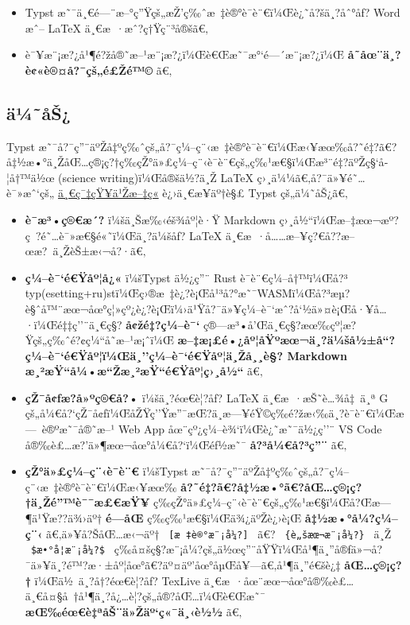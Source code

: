 \begin{itemize}
\tightlist
\item
  Typst æ˜¯ä¸€é---¨æ--°ç''Ÿçš„æŽ'ç‰ˆæ~‡è®°è¯­è¨€ï¼Œè¿˜å?šä¸?åˆ°åƒ? Word
  æˆ-- LaTeX ä¸€æ~·æˆ?ç†Ÿç¨³å®šã€‚
\item
  è¯¥æ¨¡æ?¿å¹¶é?žå®˜æ--¹æ¨¡æ?¿ï¼Œè€Œæ˜¯æ°`é---´æ¨¡æ?¿ï¼Œ
  \textbf{å­˜åœ¨ä¸?è¢«è®¤å?¯çš„é£Žé™©} ã€‚
\end{itemize}

\subsection{ä¼˜åŠ¿}\label{uxe4uxbcuxe5ux161}

Typst
æ˜¯å?¯ç''¨äºŽå‡ºç‰ˆçš„å?¯ç¼--ç¨‹æ~‡è®°è¯­è¨€ï¼Œæ‹¥æœ‰å?˜é‡?ã€?å‡½æ•°ä¸ŽåŒ\ldots ç®¡ç?†ç­‰çŽ°ä»£ç¼--ç¨‹è¯­è¨€çš„ç‰¹æ€§ï¼Œæ³¨é‡?äºŽç§`å­¦å†™ä½œ
(science writing)ï¼Œå®šä½?ä¸Ž LaTeX ç›¸ä¼¼ã€‚å?¯ä»¥é˜\ldots è¯»æˆ`çš„
\href{https://zhuanlan.zhihu.com/p/669097092}{ä¸€ç¯‡çŸ¥ä¹Žæ--‡ç«}
è¿›ä¸€æ­¥äº†è§£ Typst çš„ä¼˜åŠ¿ã€‚

\begin{itemize}
\tightlist
\item
  \textbf{è¯­æ³•ç®€æ´?} ï¼šä¸Šæ‰‹éš¾åº¦è·Ÿ Markdown
  ç›¸å½``ï¼Œæ--‡æœ¬æº?ç~?é˜\ldots è¯»æ€§é«˜ï¼Œä¸?ä¼šåƒ? LaTeX
  ä¸€æ~·å\ldots\ldots æ--¥ç?€å??æ--œæ?~ä¸ŽèŠ±æ‹¬å?·ã€‚
\item
  \textbf{ç¼--è¯`é€Ÿåº¦å¿«} ï¼šTypst ä½¿ç''¨ Rust è¯­è¨€ç¼--å†™ï¼Œå?³
  typ(esetting+ru)stï¼Œç›®æ~‡è¿?è¡Œå¹³å?°æ˜¯WASMï¼Œå?³æµ?è§ˆå™¨æœ¬åœ°ç¦»çº¿è¿?è¡Œï¼›ä¹Ÿå?¯ä»¥ç¼--è¯`æˆ?å`½ä»¤è¡Œå·¥å\ldots·ï¼Œé‡‡ç''¨ä¸€ç§?
  \textbf{å¢žé‡?ç¼--è¯`}
  ç®---æ³•å'Œä¸€ç§?æœ‰çº¦æ?Ÿçš„ç‰ˆé?¢ç¼``å­˜æ--¹æ¡ˆï¼Œ
  \textbf{æ--‡æ¡£é•¿åº¦åŸºæœ¬ä¸?ä¼šå½±å``?ç¼--è¯`é€Ÿåº¦ï¼Œä¸''ç¼--è¯`é€Ÿåº¦ä¸Žå¸¸è§?
  Markdown æ¸²æŸ``å¼•æ``Žæ¸²æŸ``é€Ÿåº¦ç›¸å½``} ã€‚
\item
  \textbf{çŽ¯å¢ƒæ?­å»ºç®€å?•} ï¼šä¸?éœ€è¦?åƒ? LaTeX
  ä¸€æ~·æŠ˜è\ldots¾å‡~ä¸ª G
  çš„å¼€å?{}`çŽ¯å¢ƒï¼ŒåŽŸç''Ÿæ''¯æŒ?ä¸­æ---¥éŸ©ç­‰é?žæ‹‰ä¸?è¯­è¨€ï¼Œæ---~è®ºæ˜¯å®˜æ--¹
  Web App åœ¨çº¿ç¼--è¾`ï¼Œè¿˜æ˜¯ä½¿ç''¨ VS Code
  å®‰è£\ldots æ?'ä»¶æœ¬åœ°å¼€å?{}`ï¼Œéƒ½æ˜¯ \textbf{å?³å¼€å?³ç''¨} ã€‚
\item
  \textbf{çŽ°ä»£ç¼--ç¨‹è¯­è¨€} ï¼šTypst
  æ˜¯å?¯ç''¨äºŽå‡ºç‰ˆçš„å?¯ç¼--ç¨‹æ~‡è®°è¯­è¨€ï¼Œæ‹¥æœ‰
  \textbf{å?˜é‡?ã€?å‡½æ•°ã€?åŒ\ldots ç®¡ç?†ä¸Žé''™è¯¯æ£€æŸ¥}
  ç­‰çŽ°ä»£ç¼--ç¨‹è¯­è¨€çš„ç‰¹æ€§ï¼Œå?Œæ---¶ä¹Ÿæ??ä¾›äº† \textbf{é---­åŒ}
  ç­‰ç‰¹æ€§ï¼Œä¾¿äºŽè¿›è¡Œ \textbf{å‡½æ•°å¼?ç¼--ç¨‹}
  ã€‚ä»¥å?ŠåŒ\ldots æ‹¬äº† \texttt{\ {[}æ~‡è®°æ¨¡å¼?{]}\ } ã€?
  \texttt{\ \{è„šæœ¬æ¨¡å¼?\}\ } ä¸Ž \texttt{\ \$æ•°å­¦æ¨¡å¼?\$\ }
  ç­‰å¤šç§?æ¨¡å¼?çš„ä½œç''¨åŸŸï¼Œå¹¶ä¸''å®ƒä»¬å?¯ä»¥ä¸?é™?æ·±åº¦åœ°ã€?äº¤äº'åœ°åµŒå¥---ã€‚å¹¶ä¸''é€šè¿‡
  \textbf{åŒ\ldots ç®¡ç?†} ï¼Œä½~ä¸?å†?éœ€è¦?åƒ? TexLive
  ä¸€æ~·åœ¨æœ¬åœ°å®‰è£\ldots ä¸€å¤§å~†å¹¶ä¸?å¿\ldots è¦?çš„å®?åŒ\ldots ï¼Œè€Œæ˜¯
  \textbf{æŒ‰éœ€è‡ªåŠ¨ä»Žäº`ç«¯ä¸‹è½½} ã€‚
\end{itemize}

